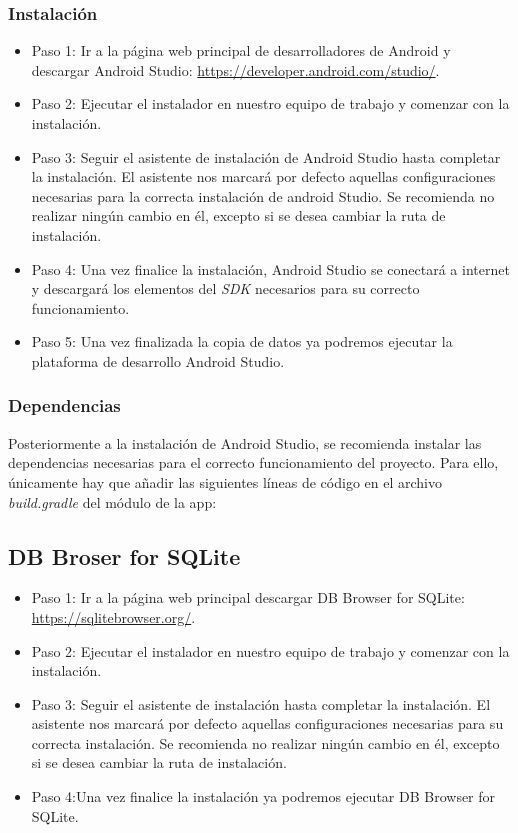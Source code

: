 \subsubsection{Instalación}
\begin{itemize}
	\item Paso 1: Ir a la página web principal de desarrolladores de Android y descargar Android Studio:  \url{https://developer.android.com/studio/}.
	\item Paso 2: Ejecutar el instalador en nuestro equipo de trabajo y comenzar con la instalación.
	\item Paso 3: Seguir el asistente de instalación de Android Studio hasta completar la instalación. El asistente nos marcará por defecto aquellas configuraciones necesarias para la correcta instalación de android Studio. Se recomienda no realizar ningún cambio en él, excepto si se desea cambiar la ruta de instalación.
	\item Paso 4: Una vez finalice la instalación, Android Studio se conectará a internet y descargará los elementos del \textit{SDK} necesarios para su correcto funcionamiento.
	\item Paso 5: Una vez finalizada la copia de datos ya podremos ejecutar la plataforma de desarrollo Android Studio.
\end{itemize}
\subsubsection{Dependencias}
Posteriormente a la instalación de Android Studio, se recomienda instalar las dependencias necesarias para el correcto funcionamiento del proyecto. Para ello, únicamente hay que añadir las siguientes líneas de código en el archivo \textit{build.gradle} del módulo de la app:
\subsection{DB Broser for SQLite}
\begin{itemize}
	\item Paso 1: Ir a la página web principal descargar DB Browser for SQLite: \url{https://sqlitebrowser.org/}.
	\item Paso 2: Ejecutar el instalador en nuestro equipo de trabajo y comenzar con la instalación.
	\item Paso 3: Seguir el asistente de instalación hasta completar la instalación. El asistente nos marcará por defecto aquellas configuraciones necesarias para su correcta instalación. Se recomienda no realizar ningún cambio en él, excepto si se desea cambiar la ruta de instalación.
	\item Paso 4:Una vez finalice la instalación ya podremos ejecutar DB Browser for SQLite.
\end{itemize}
